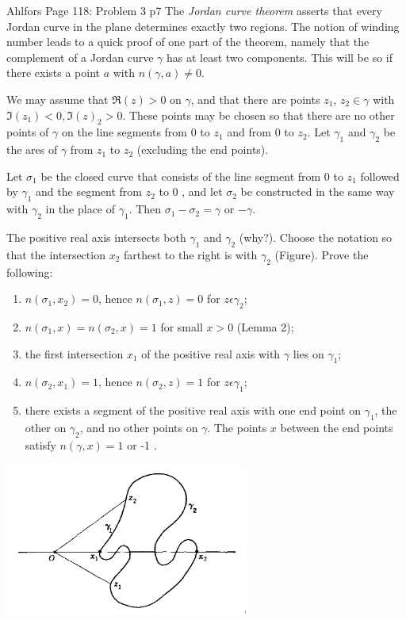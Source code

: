 \documentclass[a4paper, 11pt]{article}
\begin{document}
\begin{problem}{%
Ahlfors Page 118: Problem 3
}{p7%
}
\parinn The \textit{Jordan curve theorem} asserts that every Jordan curve in the plane determines exactly two regions. The notion of winding number leads to a quick proof of one part of the theorem, namely that the complement of a Jordan curve $\gamma$ has at least two components. This will be so if there exists a point $a$ with $n(\gamma, a) \neq 0$.

We may assume that $\Re (z)>0$ on $\gamma$, and that there are points $z_1$, $z_2 \in \gamma$ with $\Im (z_1)<0, \Im (z)_2>0$. These points may be chosen so that there are no other points of $\gamma$ on the line segments from 0 to $z_1$ and from 0 to $z_2$. Let $\gamma_1$ and $\gamma_2$ be the ares of $\gamma$ from $z_1$ to $z_2$ (excluding the end points).

Let $\sigma_1$ be the closed curve that consists of the line segment from 0 to $z_1$ followed by $\gamma_1$ and the segment from $z_2$ to 0 , and let $\sigma_2$ be constructed in the same way with $\gamma_2$ in the place of $\gamma_1$. Then $\sigma_1-\sigma_2=\gamma$ or $-\gamma$.

The positive real axis intersects both $\gamma_1$ and $\gamma_2$ (why?). Choose the notation so that the intersection $x_2$ farthest to the right is with $\gamma_2$ (Figure). Prove the following:
\begin{enumerate}[label=(\alph*)]
    \item $n\left(\sigma_1, x_2\right)=0$, hence $n\left(\sigma_1, z\right)=0$ for $z \epsilon \gamma_2$;
    \item $n\left(\sigma_1, x\right)=n\left(\sigma_2, x\right)=1$ for small $x>0$ (Lemma 2);
    \item the first intersection $x_1$ of the positive real axis with $\gamma$ lies on $\gamma_1$;
    \item $n\left(\sigma_2, x_1\right)=1$, hence $n\left(\sigma_2, z\right)=1$ for $z \epsilon \gamma_1$;
    \item there exists a segment of the positive real axis with one end point on $\gamma_1$, the other on $\gamma_2$, and no other points on $\gamma$. The points $x$ between the end points satisfy $n(\gamma, x)=1$ or -1 .

\end{enumerate}
\begin{center}
    \begin{minipage}[t]{0.5\linewidth}
        \centering
        \includegraphics[width=8cm]{jct.png}
    \end{minipage}
\end{center}
\end{problem}
\end{document}
